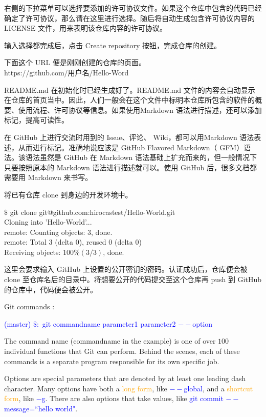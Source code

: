 \documentclass[12pt,a4paper]{article}
\begin{document}
右侧的下拉菜单可以选择要添加的许可协议文件。如果这个仓库中包含的代码已经确定了许可协议，那么请在这里进行选择。随后将自动生成包含许可协议内容的 LICENSE 文件，用来表明该仓库内容的许可协议。

输入选择都完成后，点击 Create repository 按钮，完成仓库的创建。

下面这个 URL 便是刚刚创建的仓库的页面。\\
https://github.com/用户名/Hello-Word

README.md 在初始化时已经生成好了。README.md 文件的内容会自动显示在仓库的首页当中。因此，人们一般会在这个文件中标明本仓库所包含的软件的概要、使用流程、许可协议等信息。如果使用Markdown 语法进行描述，还可以添加标记，提高可读性。

在 GitHub 上进行交流时用到的 Issue、评论、 Wiki，都可以用Markdown 语法表述，从而进行标记。准确地说应该是 GitHub Flavored Markdown（ GFM）语法。该语法虽然是 GitHub 在 Markdown 语法基础上扩充而来的，但一般情况下只要按照原本的 Markdown 语法进行描述就可以。使用 GitHub 后，很多文档都需要用 Markdown 来书写。

将已有仓库 clone 到身边的开发环境中。

$\$$ git clone git@github.com:hirocastest/Hello-World.git \\
Cloning into 'Hello-World'... \\
remote: Counting objects: 3, done. \\
remote: Total 3 (delta 0), reused 0 (delta 0) \\
Receiving objects: $100\% (3/3)$, done.

这里会要求输入 GitHub 上设置的公开密钥的密码。认证成功后，仓库便会被 clone 至仓库名后的目录中。将想要公开的代码提交至这个仓库再 push 到 GitHub 的仓库中，代码便会被公开。







Git commands :

\textcolor{blue}{(master) $\$:$ git commandname parameter1 parameter2 $--$option}

The command name (commandname in the example) is one of over $100$ individual functions that Git can perform. Behind the scenes, each of these commands is a separate program responsible for its own specific job. 

Options are special parameters that are denoted by at least one leading dash character. Many options have both a \textcolor{orange}{long form}, like \textcolor{blue}{$--$global}, and a \textcolor{orange}{shortcut form}, like \textcolor{blue}{$-$g}. There are also options that take values, like \textcolor{blue}{git commit $--$message=``hello world"}.
\end{document}
